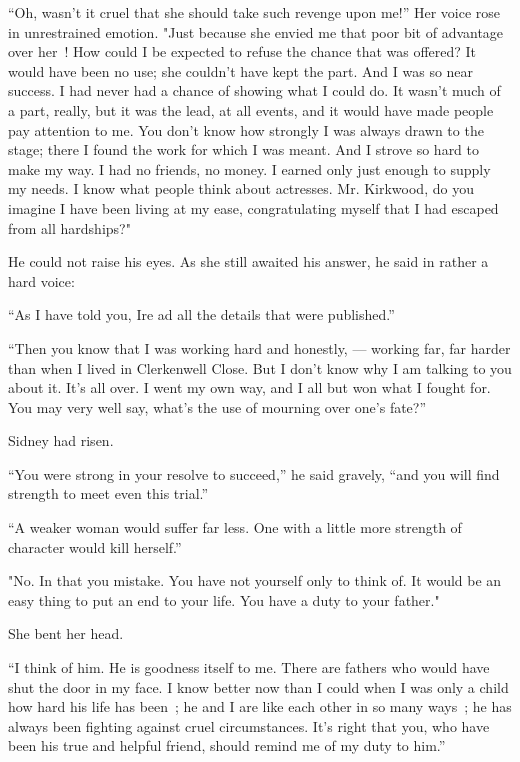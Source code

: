 ``Oh, wasn't it cruel that she should take such revenge upon me!'' Her
voice rose in unrestrained emotion. "Just because she envied me that
poor bit of advantage over her~! How could I be expected to refuse the
chance that was offered? It would have been no use; she couldn't have
kept the part. And I was so near success. I had never had a chance of
showing what I could do. It wasn't much of a part, really, but it was
the lead, at all events, and it would have made people pay attention to
me. You don't know how strongly I was always drawn to the stage; there I
found the work for which I was meant. And I strove so hard to make my
way. I had no friends, no money. I earned only just enough to supply my
needs. I know what {\protect\hypertarget{86}{}{}} people think about
actresses. Mr. Kirkwood, do you imagine I have been living at my ease,
congratulating myself that I had escaped from all hardships?"

He could not raise his eyes. As she still awaited his answer, he said in
rather a hard voice:

``As I have told you, Ire ad all the details that were published.''

``Then you know that I was working hard and honestly, --- working far,
far harder than when I lived in Clerkenwell Close. But I don't know why
I am talking to you about it. It's all over. I went my own way, and I
all but won what I fought for. You may very well say, what's the use of
mourning over one's fate?''

Sidney had risen.

``You were strong in your resolve to succeed,'' he said gravely, ``and
you will find strength to meet even this trial.''

``A weaker woman would suffer far less. One with a little more strength
of character would kill herself.''

"No. In that you mistake. You have not yourself only to think of. It
would be an {\protect\hypertarget{87}{}{}} easy thing to put an end to
your life. You have a duty to your father."

She bent her head.

``I think of him. He is goodness itself to me. There are fathers who
would have shut the door in my face. I know better now than I could when
I was only a child how hard his life has been~; he and I are like each
other in so many ways~; he has always been fighting against cruel
circumstances. It's right that you, who have been his true and helpful
friend, should remind me of my duty to him.''

